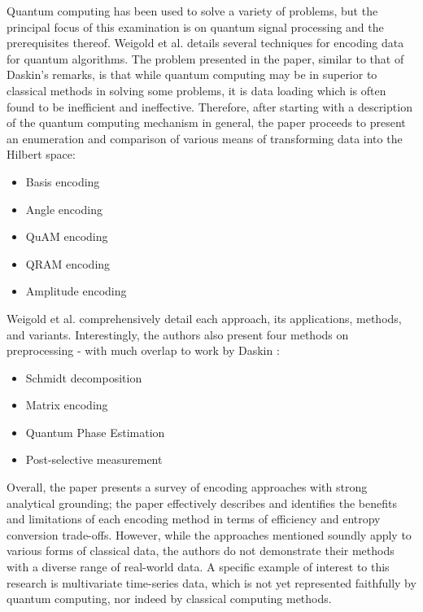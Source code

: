 Quantum computing has been used to solve a variety of problems, but the principal focus of this examination is on quantum signal processing and the prerequisites thereof.
Weigold et al. \cite{weigold_encoding_2021} details several techniques for encoding data for quantum algorithms.
The problem presented in the paper, similar to that of Daskin's remarks, is that while quantum computing may be in superior to classical methods in solving some problems, it is data loading which is often found to be inefficient and ineffective.
Therefore, after starting with a description of the quantum computing mechanism in general, the paper proceeds to present an enumeration and comparison of various means of transforming data into the Hilbert space:

\begin{itemize}
 \item Basis encoding
 \item Angle encoding
 \item QuAM encoding 
 \item QRAM encoding
 \item Amplitude encoding
\end{itemize}

Weigold et al. comprehensively detail each approach, its applications, methods, and variants.
Interestingly, the authors also present four methods on preprocessing - with much overlap to work by Daskin \cite{daskin_walk_2022}:

\begin{itemize}
 \item Schmidt decomposition
 \item Matrix encoding
 \item Quantum Phase Estimation
 \item Post-selective measurement
\end{itemize}

Overall, the paper presents a survey of encoding approaches with strong analytical grounding; the paper effectively describes and identifies the benefits and limitations of each encoding method in terms of efficiency and entropy conversion trade-offs.
However, while the approaches mentioned soundly apply to various forms of classical data, the authors do not demonstrate their methods with a diverse range of real-world data. 
A specific example of interest to this research is multivariate time-series data, which is not yet represented faithfully by quantum computing, nor indeed by classical computing methods.

